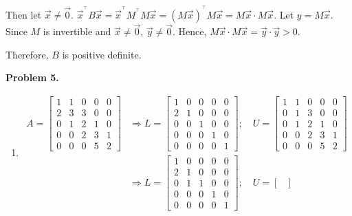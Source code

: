 \documentclass{article}
\begin{document}
Then let $\vec{x}\neq \vec{0}$. $\vec{x}^{^\top}B\vec{x} = \vec{x}^{^\top}M^{^\top}M\vec{x} = (M\vec{x})^{^\top}M\vec{x} = M\vec{x} \cdot M\vec{x}$. 
Let $y = M\vec{x}$. 
Since $M$ is invertible and $\vec{x} \neq \vec{0}$, $\vec{y}\neq\vec{0}$.
Hence, $M\vec{x}\cdot M\vec{x} = \vec{y}\cdot \vec{y} > 0$.

Therefore, $B$ is positive definite.
\bigbreak

\textbf{Problem 5.}
\begin{enumerate}[label={\alph*)}]
    \item 
    \begin{align}
        A = \begin{bmatrix}
            1 & 1 & 0 & 0 & 0 \\
            2 & 3 & 3 & 0 & 0 \\
            0 & 1 & 2 & 1 & 0 \\
            0 & 0 & 2 & 3 & 1 \\
            0 & 0 & 0 & 5 & 2
        \end{bmatrix} & \Rightarrow 
        L = \begin{bmatrix}
            1 & 0 & 0 & 0 & 0 \\
            2 & 1 & 0 & 0 & 0 \\
            0 & 0 & 1 & 0 & 0 \\
            0 & 0 & 0 & 1 & 0 \\
            0 & 0 & 0 & 0 & 1
        \end{bmatrix}; \quad
        U = \begin{bmatrix}
            1 & 1 & 0 & 0 & 0 \\
            0 & 1 & 3 & 0 & 0 \\
            0 & 1 & 2 & 1 & 0 \\
            0 & 0 & 2 & 3 & 1 \\
            0 & 0 & 0 & 5 & 2
        \end{bmatrix} \nonumber \\ 
        & \Rightarrow
        L = \begin{bmatrix}
            1 & 0 & 0 & 0 & 0 \\
            2 & 1 & 0 & 0 & 0 \\
            0 & 1 & 1 & 0 & 0 \\
            0 & 0 & 0 & 1 & 0 \\
            0 & 0 & 0 & 0 & 1
        \end{bmatrix}; \quad
        U = \begin{bmatrix}

\end{bmatrix}
\end{align}
\end{enumerate}
\end{document}
